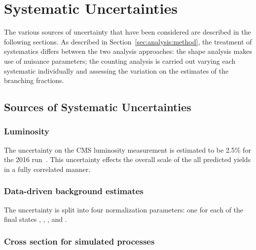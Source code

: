 \section{Systematic Uncertainties}
\label{sec:analysis:systematics}


The various sources of uncertainty that have been considered are described in the following sections. As described in Section~\ref{sec:analysis:method},  the treatment of systematics differs between the two analysis approaches: the shape analysis makes use of nuisance parameters; the counting analysis is carried out varying each systematic individually and assessing the variation on the estimates of the branching fractions.


\subsection{Sources of Systematic Uncertainties}
\label{sec:analysis:systematics:source}


\subsubsection{Luminosity} 
The uncertainty on the CMS luminosity measurement is estimated to be 2.5\% for the 2016 run~\cite{CMS-PAS-LUM-17-001}.  This uncertainty effects the overall scale of the all predicted yields in a fully correlated manner. 


\subsubsection{Data-driven background estimates}

The uncertainty is split into four normalization parameters: one for each of the final states \cet, \cmt, \ceh, and \cmh.  

\subsubsection{Cross section for simulated processes}

